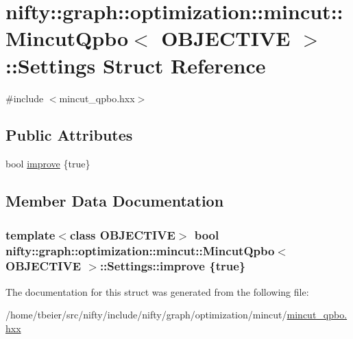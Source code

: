 \hypertarget{structnifty_1_1graph_1_1optimization_1_1mincut_1_1MincutQpbo_1_1Settings}{}\section{nifty\+:\+:graph\+:\+:optimization\+:\+:mincut\+:\+:Mincut\+Qpbo$<$ O\+B\+J\+E\+C\+T\+I\+V\+E $>$\+:\+:Settings Struct Reference}
\label{structnifty_1_1graph_1_1optimization_1_1mincut_1_1MincutQpbo_1_1Settings}


{\ttfamily \#include $<$mincut\+\_\+qpbo.\+hxx$>$}

\subsection*{Public Attributes}
\begin{DoxyCompactItemize}
\item 
bool \hyperlink{structnifty_1_1graph_1_1optimization_1_1mincut_1_1MincutQpbo_1_1Settings_a4f55a86f60cb816b9380a2a8b30c547e}{improve} \{true\}
\end{DoxyCompactItemize}


\subsection{Member Data Documentation}
\hypertarget{structnifty_1_1graph_1_1optimization_1_1mincut_1_1MincutQpbo_1_1Settings_a4f55a86f60cb816b9380a2a8b30c547e}{}
\subsubsection[{improve}]{\setlength{\rightskip}{0pt plus 5cm}template$<$class O\+B\+J\+E\+C\+T\+I\+V\+E$>$ bool {\bf nifty\+::graph\+::optimization\+::mincut\+::\+Mincut\+Qpbo}$<$ O\+B\+J\+E\+C\+T\+I\+V\+E $>$\+::Settings\+::improve \{true\}}\label{structnifty_1_1graph_1_1optimization_1_1mincut_1_1MincutQpbo_1_1Settings_a4f55a86f60cb816b9380a2a8b30c547e}


The documentation for this struct was generated from the following file\+:\begin{DoxyCompactItemize}
\item 
/home/tbeier/src/nifty/include/nifty/graph/optimization/mincut/\hyperlink{mincut__qpbo_8hxx}{mincut\+\_\+qpbo.\+hxx}\end{DoxyCompactItemize}
